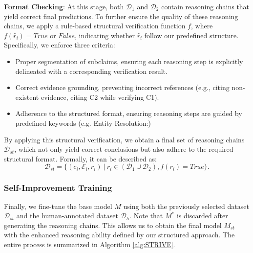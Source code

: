 \textbf{Format Checking}: At this stage, both $\mathcal{D}_1$ and $\mathcal{D}_2$ contain reasoning chains that yield correct final predictions. To further ensure the quality of these reasoning chains, we apply a rule-based structural verification function $f$, where $f(\hat r_i)=\textit{True} \text{ or } \textit{False}$, indicating whether $\hat r_i$ follow our predefined structure. Specifically, we enforce three criteria:  
\begin{itemize}
\item Proper segmentation of subclaims, ensuring each reasoning step is explicitly delineated with a corresponding verification result.  
\item Correct evidence grounding, preventing incorrect references (e.g., citing non-existent evidence, citing C2 while verifying C1).  
\item Adherence to the structured format, ensuring reasoning steps are guided by predefined keywords (e.g. Entity Resolution:)
\end{itemize}
By applying this structural verification, we obtain a final set of reasoning chains $\mathcal{D}_{st}$, which not only yield correct conclusions but also adhere to the required structural format. Formally, it can be described as:
\begin{equation*}
\mathcal{D}_{st} = \{ (c_i, \mathcal{E}_i, r_i) \ |\ r_i \in (\mathcal{D}_1 \cup \mathcal{D}_2), f(r_i) = \textit{True} \}.
\end{equation*}


\subsubsection{Self-Improvement Training}
Finally, we fine-tune the base model $M$ using both the previously selected dataset $\mathcal{D}_{st}$ and the human-annotated dataset $\mathcal{D}_h$. Note that $M^*$ is discarded after generating the reasoning chains. This allows us to obtain the final model $M_{st}$ with the enhanced reasoning ability defined by our structured approach. The entire process is summarized in Algorithm \ref{alg:STRIVE}.


